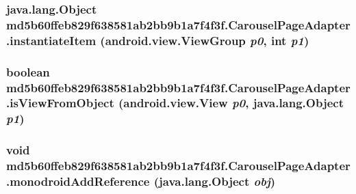 \hypertarget{classmd5b60ffeb829f638581ab2bb9b1a7f4f3f_1_1_carousel_page_adapter_dc3ae71455cc6ba15871925d4a065505}{
\subsubsection[{instantiateItem}]{\setlength{\rightskip}{0pt plus 5cm}java.lang.Object md5b60ffeb829f638581ab2bb9b1a7f4f3f.CarouselPageAdapter.instantiateItem (android.view.ViewGroup {\em p0}, \/  int {\em p1})}}
\label{classmd5b60ffeb829f638581ab2bb9b1a7f4f3f_1_1_carousel_page_adapter_dc3ae71455cc6ba15871925d4a065505}


\hypertarget{classmd5b60ffeb829f638581ab2bb9b1a7f4f3f_1_1_carousel_page_adapter_12525022977645735ade145e4b25585a}{
\subsubsection[{isViewFromObject}]{\setlength{\rightskip}{0pt plus 5cm}boolean md5b60ffeb829f638581ab2bb9b1a7f4f3f.CarouselPageAdapter.isViewFromObject (android.view.View {\em p0}, \/  java.lang.Object {\em p1})}}
\label{classmd5b60ffeb829f638581ab2bb9b1a7f4f3f_1_1_carousel_page_adapter_12525022977645735ade145e4b25585a}


\hypertarget{classmd5b60ffeb829f638581ab2bb9b1a7f4f3f_1_1_carousel_page_adapter_1f2a2b6fa20f43e6389b1ff39fbe3d49}{
\subsubsection[{monodroidAddReference}]{\setlength{\rightskip}{0pt plus 5cm}void md5b60ffeb829f638581ab2bb9b1a7f4f3f.CarouselPageAdapter.monodroidAddReference (java.lang.Object {\em obj})}}
\label{classmd5b60ffeb829f638581ab2bb9b1a7f4f3f_1_1_carousel_page_adapter_1f2a2b6fa20f43e6389b1ff39fbe3d49}


